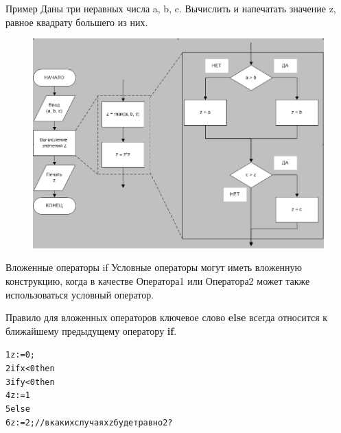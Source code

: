 \documentclass{beamer}
\begin{document}
\begin{frame}[fragile]{Пример}
Даны три неравных числа a, b, c. Вычислить и напечатать значение z, равное квадрату большего из них.
\begin{figure}[h]
\centering
\includegraphics[scale=0.35]{images/lec03-pic06.png}
\end{figure}
\end{frame}

\begin{frame}[fragile]{Вложенные операторы if}
Условные операторы могут иметь вложенную конструкцию, когда в качестве Оператора1 или Оператора2 может также использоваться условный оператор. 
\begin{block}{Правило для вложенных операторов}
ключевое слово \textbf{else} всегда относится к ближайшему предыдущему оператору \textbf{if}.
\end{block}
\begin{alltt}
1 z := 0;
2 if x < 0 then
3    if y < 0 then
4       z := 1
5 else
6    z := 2; // в каких случаях z будет равно 2?
\end{alltt}
\end{frame}
\end{document}

